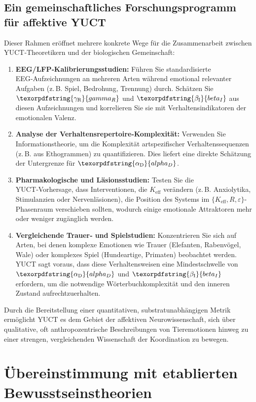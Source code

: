 \documentclass[12pt,a4paper]{article}
\DeclareRobustCommand{\alD}{\texorpdfstring{\ensuremath{\alpha_{\mathrm{D}}}}{alpha_D}}
\DeclareRobustCommand{\beI}{\texorpdfstring{\ensuremath{\beta_{\mathrm{I}}}}{beta_I}}
\DeclareRobustCommand{\gaR}{\texorpdfstring{\ensuremath{\gamma_{\mathrm{R}}}}{gamma_R}}
\begin{document}
	\subsection{Ein gemeinschaftliches Forschungsprogramm für affektive YUCT}
	
	Dieser Rahmen eröffnet mehrere konkrete Wege für die Zusammenarbeit zwischen YUCT‑Theoretikern und der biologischen Gemeinschaft:
	
	\begin{enumerate}
		\item \textbf{EEG/LFP‑Kalibrierungsstudien:} Führen Sie standardisierte EEG‑Aufzeichnungen an mehreren Arten während emotional relevanter Aufgaben (z. B. Spiel, Bedrohung, Trennung) durch. Schätzen Sie \(\gaR\) und \(\beI\) aus diesen Aufzeichnungen und korrelieren Sie sie mit Verhaltensindikatoren der emotionalen Valenz.
		\item \textbf{Analyse der Verhaltensrepertoire‑Komplexität:} Verwenden Sie Informationstheorie, um die Komplexität artspezifischer Verhaltenssequenzen (z. B. aus Ethogrammen) zu quantifizieren. Dies liefert eine direkte Schätzung der Untergrenze für \(\alD\).
		\item \textbf{Pharmakologische und Läsionsstudien:} Testen Sie die YUCT‑Vorhersage, dass Interventionen, die \(K_{\mathrm{eff}}\) verändern (z. B. Anxiolytika, Stimulanzien oder Nervenläsionen), die Position des Systems im \(\{K_{\mathrm{eff}}, R, \varepsilon\}\)-Phasenraum verschieben sollten, wodurch einige emotionale Attraktoren mehr oder weniger zugänglich werden.
		\item \textbf{Vergleichende Trauer‑ und Spielstudien:} Konzentrieren Sie sich auf Arten, bei denen komplexe Emotionen wie Trauer (Elefanten, Rabenvögel, Wale) oder komplexes Spiel (Hundeartige, Primaten) beobachtet werden. YUCT sagt voraus, dass diese Verhaltensweisen eine Mindestschwelle von \(\alD\) und \(\beI\) erfordern, um die notwendige Wörterbuchkomplexität und den inneren Zustand aufrechtzuerhalten.
	\end{enumerate}
	
	Durch die Bereitstellung einer quantitativen, substratunabhängigen Metrik ermöglicht YUCT es dem Gebiet der affektiven Neurowissenschaft, sich über qualitative, oft anthropozentrische Beschreibungen von Tieremotionen hinweg zu einer strengen, vergleichenden Wissenschaft der Koordination zu bewegen.
	
	\section{Übereinstimmung mit etablierten Bewusstseinstheorien}
	
\end{document}
